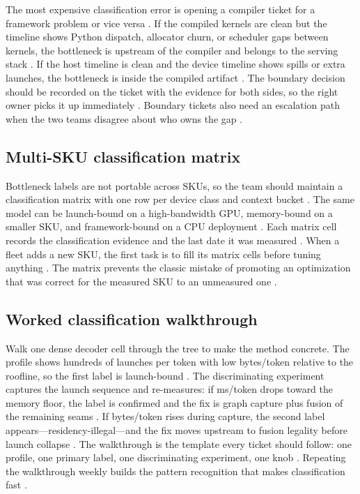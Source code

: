 The most expensive classification error is opening a compiler ticket for a framework problem or vice versa \citep{patel2025llminference,kwon2023vllm,taxbreak2026}. If the compiled kernels are clean but the timeline shows Python dispatch, allocator churn, or scheduler gaps between kernels, the bottleneck is upstream of the compiler and belongs to the serving stack \citep{kwon2023vllm,memoryfloor2026}. If the host timeline is clean and the device timeline shows spills or extra launches, the bottleneck is inside the compiled artifact \citep{chen2020compilerbasedhardw,memoryfloor2026}. The boundary decision should be recorded on the ticket with the evidence for both sides, so the right owner picks it up immediately \citep{patel2025llminference,taxbreak2026}. Boundary tickets also need an escalation path when the two teams disagree about who owns the gap \citep{chen2020compilerbasedhardw,patel2025llminference}.

\subsection{Multi-SKU classification matrix}

Bottleneck labels are not portable across SKUs, so the team should maintain a classification matrix with one row per device class and context bucket \citep{patel2025llminference,memoryfloor2026,taxbreak2026}. The same model can be launch-bound on a high-bandwidth GPU, memory-bound on a smaller SKU, and framework-bound on a CPU deployment \citep{nvidia2022hopper,dlbook,memoryfloor2026}. Each matrix cell records the classification evidence and the last date it was measured \citep{chen2020compilerbasedhardw,patel2025llminference}. When a fleet adds a new SKU, the first task is to fill its matrix cells before tuning anything \citep{memoryfloor2026,taxbreak2026}. The matrix prevents the classic mistake of promoting an optimization that was correct for the measured SKU to an unmeasured one \citep{patel2025llminference,memoryfloor2026}.

\subsection{Worked classification walkthrough}

Walk one dense decoder cell through the tree to make the method concrete. The profile shows hundreds of launches per token with low bytes/token relative to the roofline, so the first label is launch-bound \citep{taxbreak2026,memoryfloor2026}. The discriminating experiment captures the launch sequence and re-measures: if ms/token drops toward the memory floor, the label is confirmed and the fix is graph capture plus fusion of the remaining seams \citep{nvidia2024cudagraphs,memoryfloor2026}. If bytes/token rises during capture, the second label appears—residency-illegal—and the fix moves upstream to fusion legality before launch collapse \citep{dao2022flashattention,memoryfloor2026}. The walkthrough is the template every ticket should follow: one profile, one primary label, one discriminating experiment, one knob \citep{patel2025llminference,chen2020compilerbasedhardw}. Repeating the walkthrough weekly builds the pattern recognition that makes classification fast \citep{taxbreak2026,patel2025llminference}.

